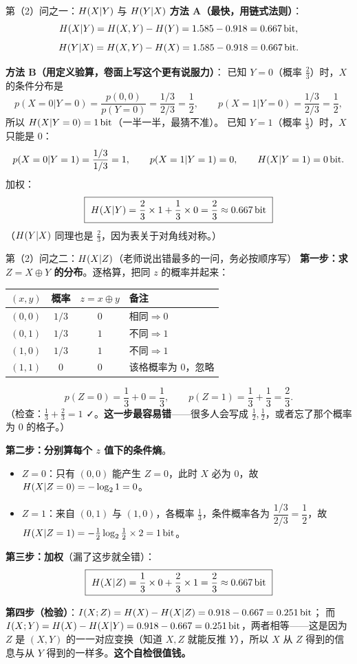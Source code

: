 \documentclass[11pt,a4paper]{ctexart}
\begin{document}
\begin{calc}{第（2）问之一：$H\!\left(X|Y\right)$ 与 $H\!\left(Y|X\right)$}
\textbf{方法 A（最快，用链式法则）}：
\[
H\!\left(X|Y\right)=H\!\left(X,Y\right)-H\!\left(Y\right)=1.585-0.918=0.667\,\text{bit} ,
\]
\[
H\!\left(Y|X\right)=H\!\left(X,Y\right)-H\!\left(X\right)=1.585-0.918=0.667\,\text{bit} .
\]

\textbf{方法 B（用定义验算，卷面上写这个更有说服力）}：
已知 $Y=0$（概率 $\frac23$）时，$X$ 的条件分布是
\[
p(X=0|Y=0)=\frac{p(0,0)}{p(Y=0)}=\frac{1/3}{2/3}=\frac12,\qquad
p(X=1|Y=0)=\frac{1/3}{2/3}=\frac12,
\]
所以 $H\!\left(X|Y=0\right)=1\,\text{bit}$（一半一半，最猜不准）。
已知 $Y=1$（概率 $\frac13$）时，$X$ 只能是 0：
\[
p(X=0|Y=1)=\frac{1/3}{1/3}=1,\qquad p(X=1|Y=1)=0,\qquad H\!\left(X|Y=1\right)=0\,\text{bit} .
\]
加权：
\[
\boxed{\ \Hx{X|Y}=\frac23\times1+\frac13\times0=\frac23\approx0.667\bit\ }
\]
（$H\!\left(Y|X\right)$ 同理也是 $\frac23$，因为表关于对角线对称。）
\end{calc}

\begin{calc}{第（2）问之二：$H\!\left(X|Z\right)$（老师说出错最多的一问，务必按顺序写）}
\textbf{第一步：求 $Z=X\oplus Y$ 的分布}。逐格算，把同 $z$ 的概率并起来：
\begin{center}
\renewcommand{\arraystretch}{1.3}
\begin{tabular}{c|c|c|l}
\toprule
$(x,y)$ & 概率 & $z=x\oplus y$ & 备注\\
\midrule
$(0,0)$ & $1/3$ & $0$ & 相同$\Rightarrow0$\\
$(0,1)$ & $1/3$ & $1$ & 不同$\Rightarrow1$\\
$(1,0)$ & $1/3$ & $1$ & 不同$\Rightarrow1$\\
$(1,1)$ & $0$ & $0$ & 该格概率为 0，忽略\\
\bottomrule
\end{tabular}
\end{center}
\[
p(Z=0)=\frac13+0=\frac13,\qquad p(Z=1)=\frac13+\frac13=\frac23 .
\]
（检查：$\frac13+\frac23=1$ ✓。\textbf{这一步最容易错}——很多人会写成 $\frac12,\frac12$，或者忘了那个概率为 0 的格子。）

\textbf{第二步：分别算每个 $z$ 值下的条件熵}。
\begin{itemize}[leftmargin=1.6em,itemsep=1pt,topsep=2pt]
  \item $Z=0$：只有 $(0,0)$ 能产生 $Z=0$，此时 $X$ 必为 0，故 $H\!\left(X|Z=0\right)=-\log_{2}1=0$。
  \item $Z=1$：来自 $(0,1)$ 与 $(1,0)$，各概率 $\frac13$，条件概率各为
        $\dfrac{1/3}{2/3}=\dfrac12$，故 $H\!\left(X|Z=1\right)=-\frac12\log_{2}\frac12\times2=1\,\text{bit}$。
\end{itemize}

\textbf{第三步：加权}（漏了这步就全错）：
\[
\boxed{\ \Hx{X|Z}=\frac13\times0+\frac23\times1=\frac23\approx0.667\bit\ }
\]

\textbf{第四步（检验）}：$I\!\left(X;Z\right)=H\!\left(X\right)-H\!\left(X|Z\right)=0.918-0.667=0.251\,\text{bit}$；
而 $I\!\left(X;Y\right)=H\!\left(X\right)-H\!\left(X|Y\right)=0.918-0.667=0.251\,\text{bit}$，两者相等——这是因为 $Z$ 是 $(X,Y)$ 的一一对应变换（知道 $X,Z$ 就能反推 $Y$），所以 $X$ 从 $Z$ 得到的信息与从 $Y$ 得到的一样多。\textbf{这个自检很值钱。}
\end{calc}
\end{document}
